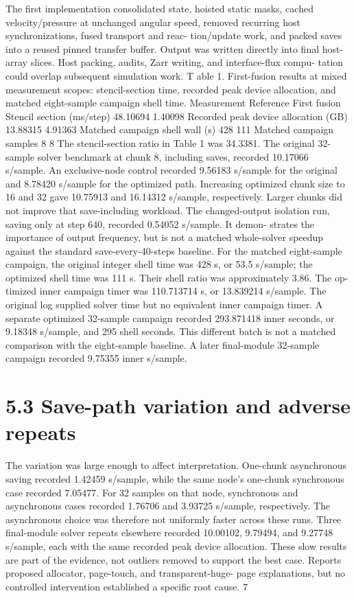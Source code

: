 \documentclass[11pt]{article}
\begin{document}
The first implementation consolidated state, hoisted static masks, cached velocity/pressure at
unchanged angular speed, removed recurring host synchronizations, fused transport and reac-
tion/update work, and packed saves into a reused pinned transfer buffer. Output was written
directly into final host-array slices. Host packing, audits, Zarr writing, and interface-flux compu-
tation could overlap subsequent simulation work.
T able 1. First-fusion results at mixed measurement scopes: stencil-section time, recorded peak
device allocation, and matched eight-sample campaign shell time.
Measurement Reference First fusion
Stencil section (ms/step) 48.10694 1.40098
Recorded peak device allocation (GB) 13.88315 4.91363
Matched campaign shell wall (s) 428 111
Matched campaign samples 8 8
The stencil-section ratio in Table 1 was 34.3381. The original 32-sample solver benchmark at
chunk 8, including saves, recorded 10.17066 s/sample. An exclusive-node control recorded 9.56183
s/sample for the original and 8.78420 s/sample for the optimized path. Increasing optimized chunk
size to 16 and 32 gave 10.75913 and 16.14312 s/sample, respectively. Larger chunks did not improve
that save-including workload.
The changed-output isolation run, saving only at step 640, recorded 0.54052 s/sample. It demon-
strates the importance of output frequency, but is not a matched whole-solver speedup against the
standard save-every-40-steps baseline.
For the matched eight-sample campaign, the original integer shell time was 428 s, or 53.5
s/sample; the optimized shell time was 111 s. Their shell ratio was approximately 3.86. The op-
timized inner campaign timer was 110.713714 s, or 13.839214 s/sample. The original log supplied
solver time but no equivalent inner campaign timer. A separate optimized 32-sample campaign
recorded 293.871418 inner seconds, or 9.18348 s/sample, and 295 shell seconds. This different
batch is not a matched comparison with the eight-sample baseline. A later final-module 32-sample
campaign recorded 9.75355 inner s/sample.

\section*{5.3 Save-path variation and adverse repeats}

The variation was large enough to affect interpretation. One-chunk asynchronous saving recorded
1.42459 s/sample, while the same node’s one-chunk synchronous case recorded 7.05477. For 32
samples on that node, synchronous and asynchronous cases recorded 1.76706 and 3.93725 s/sample,
respectively. The asynchronous choice was therefore not uniformly faster across these runs. Three
final-module solver repeats elsewhere recorded 10.00102, 9.79494, and 9.27748 s/sample, each with
the same recorded peak device allocation. These slow results are part of the evidence, not outliers
removed to support the best case. Reports proposed allocator, page-touch, and transparent-huge-
page explanations, but no controlled intervention established a specific root cause.
7
\end{document}
